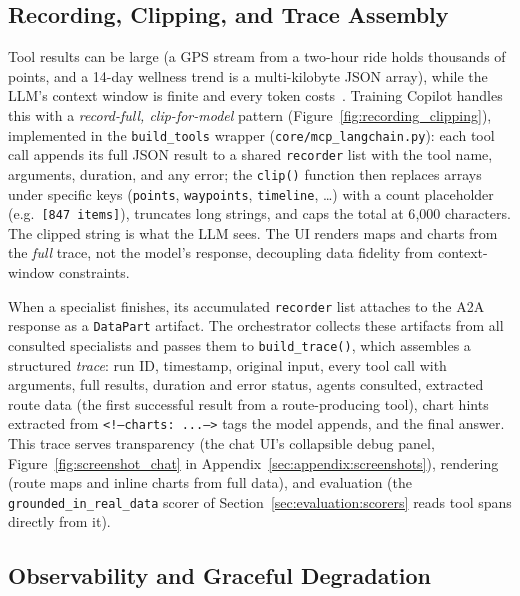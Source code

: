 \subsection{Recording, Clipping, and Trace Assembly}\label{sec:agents:recording}

Tool results can be large (a GPS stream from a two-hour ride holds thousands of points, and a 14-day wellness trend is a multi-kilobyte JSON array), while the LLM's context window is finite and every token costs~\citep{qu_tool_2024}. Training Copilot handles this with a \textit{record-full, clip-for-model} pattern (Figure~\ref{fig:recording_clipping}), implemented in the \texttt{build\_tools} wrapper (\texttt{core/mcp\_langchain.py}): each tool call appends its full JSON result to a shared \texttt{recorder} list with the tool name, arguments, duration, and any error; the \texttt{clip()} function then replaces arrays under specific keys (\texttt{points}, \texttt{waypoints}, \texttt{timeline}, \ldots) with a count placeholder (e.g.\ \texttt{[847 items]}), truncates long strings, and caps the total at 6{,}000 characters. The clipped string is what the LLM sees. The UI renders maps and charts from the \textit{full} trace, not the model's response, decoupling data fidelity from context-window constraints.



When a specialist finishes, its accumulated \texttt{recorder} list attaches to the A2A response as a \texttt{DataPart} artifact. The orchestrator collects these artifacts from all consulted specialists and passes them to \texttt{build\_trace()}, which assembles a structured \textit{trace}: run ID, timestamp, original input, every tool call with arguments, full results, duration and error status, agents consulted, extracted route data (the first successful result from a route-producing tool), chart hints extracted from \texttt{<!--charts: ...-->} tags the model appends, and the final answer. This trace serves transparency (the chat UI's collapsible debug panel, Figure~\ref{fig:screenshot_chat} in Appendix~\ref{sec:appendix:screenshots}), rendering (route maps and inline charts from full data), and evaluation (the \texttt{grounded\_in\_real\_data} scorer of Section~\ref{sec:evaluation:scorers} reads tool spans directly from it).

\subsection{Observability and Graceful Degradation}\label{sec:agents:observability}

